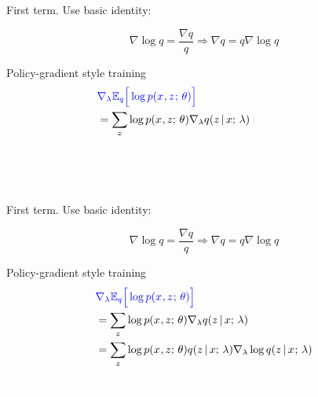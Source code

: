 \begin{frame}
First term. Use basic identity:

\[\nabla \log q = \frac{\nabla q}{q} \Rightarrow \nabla q  = q \nabla \log q \]

Policy-gradient style training \citep{Williams1992}
\begin{align*}
&{\color{blue} \nabla_\lambda {\E_{ q}\Big[ \log p(x^{}, z^{} \param \theta) \Big]}}\\
    &=  \sum_z  \log p(x^{}, z \param \theta) \nabla_\lambda   q(z \given x \param \lambda )  \\ 
        &{\color{white}=  \sum_z  \log p(x^{}, z \param \theta)  q(z \given x \param \lambda )  \nabla_\lambda \log q(z \given x^{} \param \lambda) } \\ 
    &{\color{white} = \E_{q}\Big[ \log p(x^{}, z \param \theta) \nabla_\lambda \log q(z \given x^{} \param \lambda) \Big]}
\end{align*}
\end{frame}

\begin{frame}
First term. Use basic identity:

\[\nabla \log q = \frac{\nabla q}{q} \Rightarrow \nabla q  = q \nabla \log q \]

Policy-gradient style training \citep{Williams1992}
\begin{align*}
&{\color{blue} \nabla_\lambda {\E_{ q}\Big[ \log p(x^{}, z^{} \param \theta) \Big]}}\\
    &=  \sum_z  \log p(x^{}, z \param \theta) \nabla_\lambda   q(z \given x \param \lambda )  \\ 
        &=  \sum_z  \log p(x^{}, z \param \theta)  q(z \given x \param \lambda )  \nabla_\lambda \log q(z \given x^{} \param \lambda)  \\ 
        &{\color{white} = \E_{q}\Big[ \log p(x^{}, z \param \theta) \nabla_\lambda \log q(z \given x^{} \param \lambda) \Big]}
\end{align*}
\end{frame}

